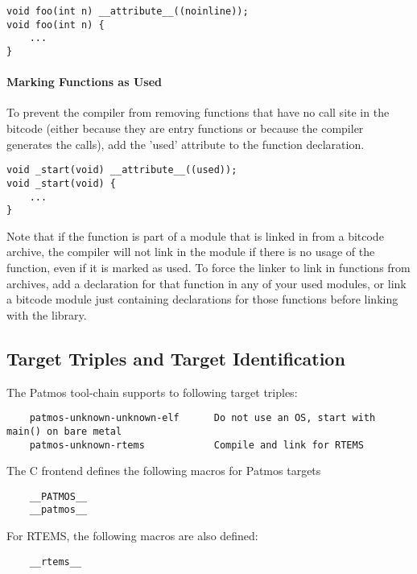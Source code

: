 \begin{verbatim}
void foo(int n) __attribute__((noinline));
void foo(int n) {
    ...
}
\end{verbatim}

\paragraph{Marking Functions as Used}
To prevent the compiler from removing functions that have no call site in the bitcode
(either because they are entry functions or because the compiler generates the calls),
add the 'used' attribute to the function declaration.

\begin{verbatim}
void _start(void) __attribute__((used));
void _start(void) {
    ...
}
\end{verbatim}

Note that if the function is part of a module that is linked in from a bitcode archive,
the compiler will not link in the module if there is no usage of the function, even if it
is marked as used. To force the linker to link in functions from archives, add a declaration
for that function in any of your used modules, or link a bitcode module just containing declarations
for those functions before linking with the library.



\subsection{Target Triples and Target Identification}

The Patmos tool-chain supports to following target triples:

\begin{verbatim}
    patmos-unknown-unknown-elf      Do not use an OS, start with main() on bare metal
    patmos-unknown-rtems            Compile and link for RTEMS
\end{verbatim}

The C frontend defines the following macros for Patmos targets

\begin{verbatim}
    __PATMOS__
    __patmos__
\end{verbatim}

For RTEMS, the following macros are also defined:

\begin{verbatim}
    __rtems__
\end{verbatim}

